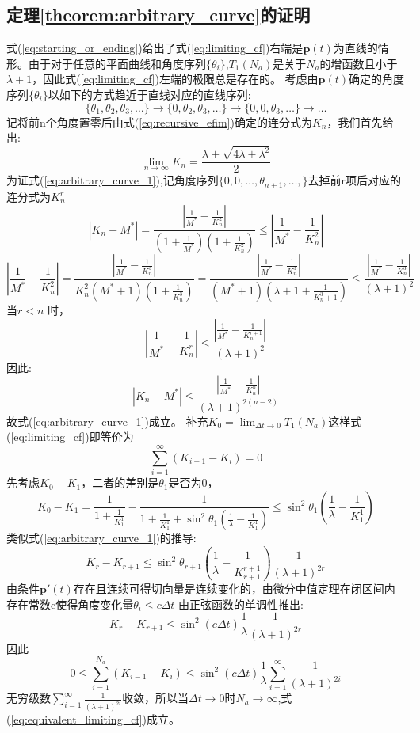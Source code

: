 \subsection{定理\ref{theorem:arbitrary_curve}的证明}\label{B_F_6}
式(\ref{eq:starting_or_ending})给出了式(\ref{eq:limiting_cf})右端是$\bm{p}(t)$为直线的情形。由于对于任意的平面曲线和角度序列$\{\theta_i\}$,$T_1(N_a)$是关于$N_a$的增函数且小于$\lambda+1$，因此式(\ref{eq:limiting_cf})左端的极限总是存在的。
考虑由$\bm{p}(t)$确定的角度序列$\{\theta_i\}$以如下的方式趋近于直线对应的直线序列:
\[
\{\theta_1,\theta_2,\theta_3,\dots\}\rightarrow\{0,\theta_2,\theta_3,\dots\}\rightarrow
\{0,0,\theta_3,\dots\}\rightarrow\dots
\]
记将前n个角度置零后由式(\ref{eq:recursive_efim})确定的连分式为$K_n$，我们首先给出:
\begin{equation}\label{eq:arbitrary_curve_1}
\lim_{n\to\infty}K_n=\frac{\lambda+\sqrt{4\lambda+\lambda^2}}{2}
\end{equation}
为证式(\ref{eq:arbitrary_curve_1}),记角度序列$\{0,0,\dots,\theta_{n+1},\dots,\}$去掉前r项后对应的连分式为$K^r_n$
\[
|K_n-M^*|=\frac{|\frac{1}{M^*}-\frac{1}{K^2_n}|}{(1+\frac{1}{M^*})(1+\frac{1}{K^2_n})}\leq |\frac{1}{M^*}-\frac{1}{K^2_n}|
\]
\[
|\frac{1}{M^*}-\frac{1}{K^2_n}|= \frac{|\frac{1}{M^*}-\frac{1}{K^3_n}|}{K^2_n(M^*+1)(1+\frac{1}{K^3_n})}=
 \frac{|\frac{1}{M^*}-\frac{1}{K^3_n}|}{(M^*+1)(\lambda+1+\frac{1}{K^3_n+1})}\leq \frac{|\frac{1}{M^*}-\frac{1}{K^3_n}|}{(\lambda+1)^2}
\]
当$r<n$ 时，
\[
|\frac{1}{M^*}-\frac{1}{K^r_n}|\leq \frac{|\frac{1}{M^*}-\frac{1}{K^{r+1}_n}|}{(\lambda+1)^2}
\]
因此:
\[
|K_n-M^*|\leq \frac{|\frac{1}{M^*}-\frac{1}{K^{n}_n}|}{(\lambda+1)^{2(n-2)}}
\]
故式(\ref{eq:arbitrary_curve_1})成立。
补充$K_0=\lim_{\Delta t\to 0}T_1(N_a)$这样式(\ref{eq:limiting_cf})即等价为
\begin{equation}\label{eq:equivalent_limiting_cf}
\sum_{i=1}^{\infty}(K_{i-1}-K_{i})=0
\end{equation}
先考虑$K_0-K_1$，二者的差别是$\theta_1$是否为0，
\[
K_0-K_1=\frac{1}{1+\frac{1}{K_1^1}}-\frac{1}{1+\frac{1}{K_1^1}+\sin^2\theta_1(\frac{1}{\lambda}-\frac{1}{K_1^1})}\leq
\sin^2\theta_1(\frac{1}{\lambda}-\frac{1}{K_1^1})
\]
类似式(\ref{eq:arbitrary_curve_1})的推导:
\[
K_r-K_{r+1}\leq \sin^2\theta_{r+1}(\frac{1}{\lambda}-\frac{1}{K_{r+1}^{r+1}})\frac{1}{(\lambda+1)^{2r}}
\]
由条件$\bm{p}'(t)$存在且连续可得切向量是连续变化的，由微分中值定理在闭区间内存在常数c使得角度变化量$\theta_i\leq c\Delta t$
由正弦函数的单调性推出:
\[
K_r-K_{r+1}\leq \sin^2 (c\Delta t) \frac{1}{\lambda}\frac{1}{(\lambda+1)^{2r}}
\]
因此
\begin{equation}\label{eq:quatratic_convergence}
0\leq \sum_{i=1}^{N_a}(K_{i-1}-K_{i})\leq \sin^2 (c\Delta t) \frac{1}{\lambda}\sum_{i=1}^{\infty}\frac{1}{(\lambda+1)^{2i}}
\end{equation}
无穷级数$\sum_{i=1}^{\infty}\frac{1}{(\lambda+1)^{2i}}$收敛，所以当$\Delta t\to 0$时$N_a\to \infty$,式(\ref{eq:equivalent_limiting_cf})成立。

